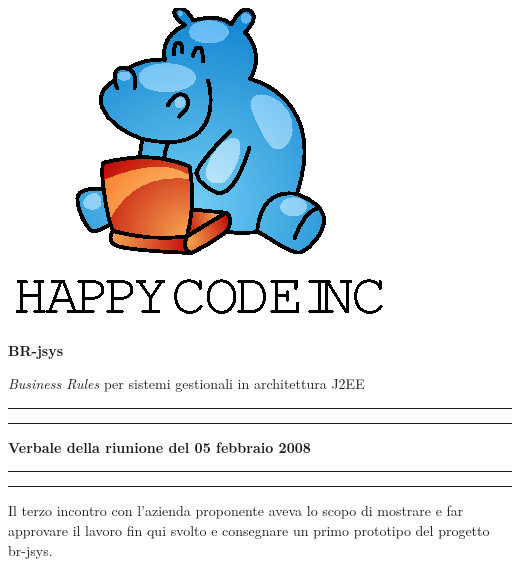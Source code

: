 \documentclass[11pt,titlepage,a4paper]{report}
\begin{document}
\begin{titlepage}
\begin{center}
\vspace*{0.5in}
\includegraphics{logo.eps}
\vspace*{0.2in}

{\Large \textbf{BR-jsys}}

{\Large \emph{Business Rules} per sistemi gestionali in architettura J2EE } 
\vspace{1.3in}
\par\rule{10cm}{.4pt} \par
\par\rule{12cm}{1pt} \par
\vspace*{0.5in}
\LARGE \textbf {Verbale della riunione del 05 febbraio 2008}
\vspace*{0.5in}
\par\rule{12cm}{1pt} \par
\par\rule{10cm}{.4pt} \par

\end{center}
\end{titlepage}
\vspace*{0.5in}
Il terzo incontro con l'azienda proponente aveva lo scopo di mostrare e far approvare il lavoro fin qui svolto e consegnare un primo prototipo del progetto br-jsys.
\thispagestyle{plain}
\end{document}
